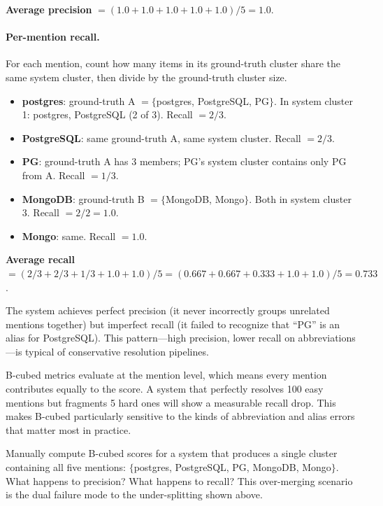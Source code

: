\noindent \textbf{Average precision} $= (1.0 + 1.0 + 1.0 + 1.0 + 1.0)/5 = 1.0$.

\paragraph{Per-mention recall.} For each mention, count how many items in its
ground-truth cluster share the same system cluster, then divide by the
ground-truth cluster size.

\begin{itemize}
    \item \textbf{postgres}: ground-truth A $= \{$postgres, PostgreSQL, PG$\}$.
          In system cluster 1: postgres, PostgreSQL (2 of 3). Recall $= 2/3$.
    \item \textbf{PostgreSQL}: same ground-truth A, same system cluster.
          Recall $= 2/3$.
    \item \textbf{PG}: ground-truth A has 3 members; PG's system cluster
          contains only PG from A. Recall $= 1/3$.
    \item \textbf{MongoDB}: ground-truth B $= \{$MongoDB, Mongo$\}$. Both in
          system cluster 3. Recall $= 2/2 = 1.0$.
    \item \textbf{Mongo}: same. Recall $= 1.0$.
\end{itemize}

\noindent \textbf{Average recall} $= (2/3 + 2/3 + 1/3 + 1.0 + 1.0)/5
= (0.667 + 0.667 + 0.333 + 1.0 + 1.0)/5 = 0.733$.

The system achieves perfect precision (it never incorrectly groups unrelated
mentions together) but imperfect recall (it failed to recognize that ``PG'' is
an alias for PostgreSQL). This pattern---high precision, lower recall on
abbreviations---is typical of conservative resolution pipelines.

\begin{keyinsight}
B-cubed metrics evaluate at the mention level, which means every mention
contributes equally to the score. A system that perfectly resolves 100 easy
mentions but fragments 5 hard ones will show a measurable recall drop. This
makes B-cubed particularly sensitive to the kinds of abbreviation and alias
errors that matter most in practice.
\end{keyinsight}

\begin{tryit}
Manually compute B-cubed scores for a system that produces a single cluster
containing all five mentions: $\{$postgres, PostgreSQL, PG, MongoDB, Mongo$\}$.
What happens to precision? What happens to recall? This over-merging scenario
is the dual failure mode to the under-splitting shown above.
\end{tryit}

